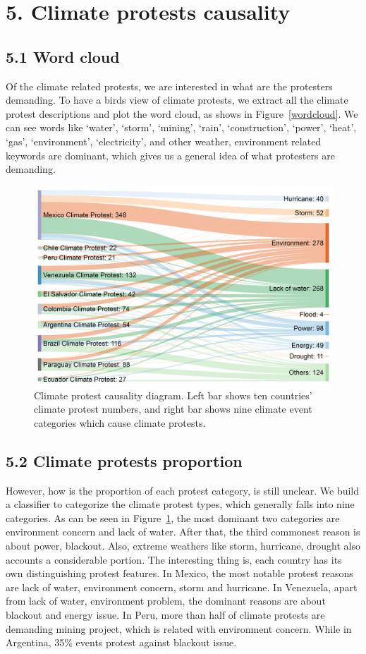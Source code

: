 \documentclass[9pt,twocolumn,twoside]{pnas-new}
\begin{document}
\section*{5. Climate protests causality}

\subsection*{5.1 Word cloud}
Of the climate related protests, we are interested in what are the protesters demanding. To have a birds view of climate protests, we extract all the climate protest descriptions and plot the word cloud, as shows in Figure~\ref{wordcloud}. We can see words like `water', `storm', `mining', `rain', `construction', `power', `heat', `gas', `environment', `electricity', and other weather, environment related keywords are dominant, which gives us a general idea of what protesters are demanding.

\begin{figure}[t]
\centerline
{\includegraphics[width=.4\textwidth]{figures/causality1}}
\caption{Climate protest causality diagram. Left bar shows ten countries' climate protest numbers, and right bar shows nine climate event categories which cause climate protests.}
\label{causality}
\end{figure}

\subsection*{5.2 Climate protests proportion}
However, how is the proportion of each protest category, is still unclear. We build a classifier to categorize the climate protest types, which generally falls into nine categories. As can be seen in Figure~\ref{causality}, the most dominant two categories are environment concern and lack of water. After that, the third commonest reason is about power, blackout. Also, extreme weathers like storm, hurricane, drought also accounts a considerable portion. The interesting thing is, each country has its own distinguishing protest features. In Mexico, the most notable protest reasons are lack of water, environment concern, storm and hurricane. In Venezuela, apart from lack of water, environment problem, the dominant reasons are about blackout and energy issue. In Peru, more than half of climate protests are demanding mining project, which is related with environment concern. While in Argentina, 35\% events protest against blackout issue.
\end{document}
